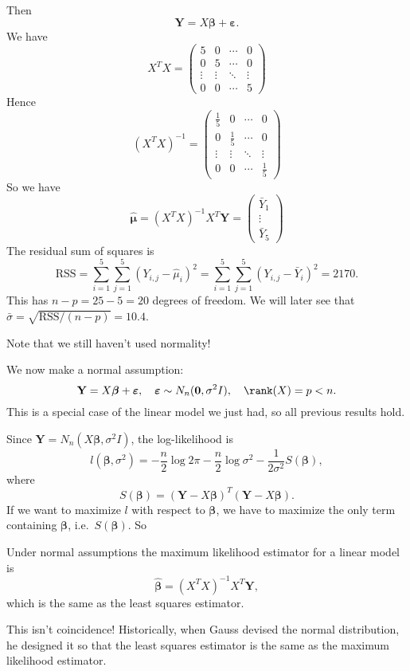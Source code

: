 \documentclass[a4paper]{article}
\begin{document}
\begin{eg}
\[  \]
  Then
  \[
    \mathbf{Y} = X\boldsymbol\beta + \boldsymbol\varepsilon.
  \]
  We have
  \[
    X^TX =
    \begin{pmatrix}
      5 & 0 & \cdots & 0\\
      0 & 5 & \cdots & 0\\
      \vdots & \vdots & \ddots & \vdots\\
      0 & 0 & \cdots & 5
    \end{pmatrix}
  \]
  Hence
  \[
    (X^TX)^{-1} =
    \begin{pmatrix}
      \frac{1}{5} & 0 & \cdots & 0\\
      0 & \frac{1}{5} & \cdots & 0\\
      \vdots & \vdots & \ddots & \vdots\\
      0 & 0 & \cdots & \frac{1}{5}
    \end{pmatrix}
  \]
  So we have
  \[
    \hat{\boldsymbol\mu} = (X^TX)^{-1}X^T\mathbf{Y} =
    \begin{pmatrix}
      \bar Y_1 \\\vdots\\ \bar Y_5
    \end{pmatrix}
  \]
  The residual sum of squares is
  \[
    \mathrm{RSS} = \sum_{i = 1}^5 \sum_{j = 1}^5 (Y_{i, j} - \hat{\mu}_i)^2 = \sum_{i = 1}^5 \sum_{j = 1}^5 (Y_{i, j} - \bar Y_i)^2 = 2170.
  \]
  This has $n - p = 25 - 5 = 20$ degrees of freedom. We will later see that $\bar \sigma = \sqrt{\mathrm{RSS}/(n - p)} = 10.4$.

  Note that we still haven't used normality!
\end{eg}

We now make a normal assumption:
\[
  \mathbf{Y} = X\boldsymbol\beta + \boldsymbol\varepsilon,\quad \boldsymbol\varepsilon\sim N_n(\mathbf{0}, \sigma^2 I),\quad \rank(X) = p < n.
\]
This is a special case of the linear model we just had, so all previous results hold.

Since $\mathbf{Y} = N_n(X\boldsymbol\beta, \sigma^2 I)$, the log-likelihood is
\[
  l(\boldsymbol\beta, \sigma^2) = -\frac{n}{2}\log 2\pi - \frac{n}{2}\log \sigma^2 - \frac{1}{2\sigma^2}S(\boldsymbol\beta),
\]
where
\[
  S(\boldsymbol\beta) = (\mathbf{Y} - X\boldsymbol\beta)^T(\mathbf{Y} - X\boldsymbol\beta).
\]
If we want to maximize $l$ with respect to $\boldsymbol\beta$, we have to maximize the only term containing $\boldsymbol\beta$, i.e.\ $S(\boldsymbol\beta)$. So
\begin{prop}
  Under normal assumptions the maximum likelihood estimator for a linear model is
  \[
    \hat{\boldsymbol\beta} = (X^TX)^{-1}X^T\mathbf{Y},
  \]
  which is the same as the least squares estimator.
\end{prop}
This isn't coincidence! Historically, when Gauss devised the normal distribution, he designed it so that the least squares estimator is the same as the maximum likelihood estimator.
\end{document}
